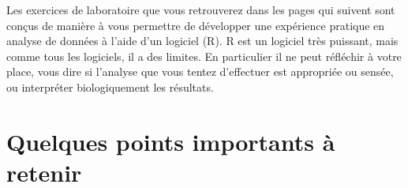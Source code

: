 \documentclass[
  12pt,
]{book}
\begin{document}
Les exercices de laboratoire que vous retrouverez dans les pages qui suivent sont conçus de manière à vous permettre de développer une expérience pratique en analyse de données à l'aide d'un logiciel (R).
R est un logiciel très puissant, mais comme tous les logiciels, il a des limites.
En particulier il ne peut réfléchir à votre place, vous dire si l'analyse que vous tentez d'effectuer est appropriée ou sensée, ou interpréter biologiquement les résultats.

\hypertarget{quelques-points-importants-uxe0-retenir}{%
\section*{Quelques points importants à retenir}\label{quelques-points-importants-uxe0-retenir}}
\end{document}
